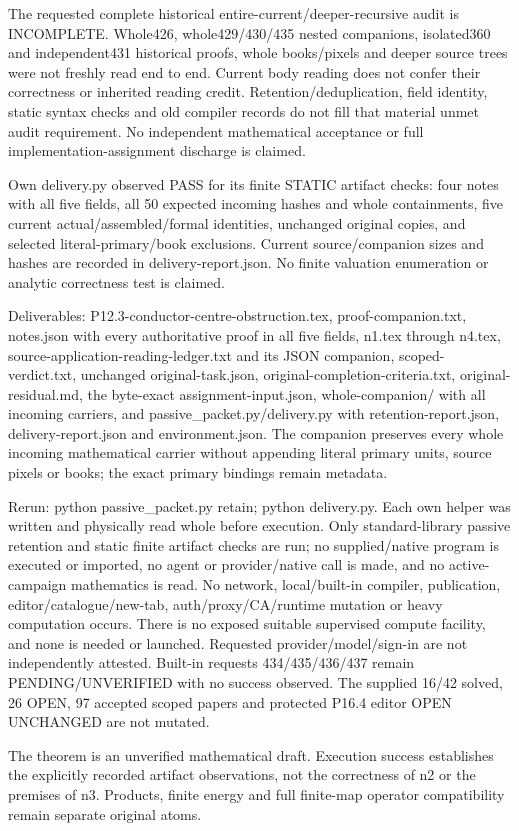The requested complete historical entire-current/deeper-recursive audit is
INCOMPLETE. Whole426, whole429/430/435 nested companions, isolated360 and
independent431 historical proofs, whole books/pixels and deeper source trees
were not freshly read end to end. Current body reading does not confer
their correctness or inherited reading credit. Retention/deduplication,
field identity, static syntax checks and old compiler records do not fill
that material unmet audit requirement. No independent mathematical
acceptance or full implementation-assignment discharge is claimed.

Own delivery.py observed PASS for its finite STATIC artifact checks:
four notes with all five fields, all 50 expected incoming hashes and whole
containments, five current actual/assembled/formal identities, unchanged
original copies, and selected literal-primary/book exclusions. Current
source/companion sizes and hashes are recorded in delivery-report.json.
No finite valuation enumeration or analytic correctness test is claimed.

Deliverables: P12.3-conductor-centre-obstruction.tex, proof-companion.txt,
notes.json with every authoritative proof in all five fields, n1.tex through
n4.tex, source-application-reading-ledger.txt and its JSON companion,
scoped-verdict.txt, unchanged original-task.json,
original-completion-criteria.txt, original-residual.md, the byte-exact
assignment-input.json, whole-companion/ with all incoming carriers, and
passive_packet.py/delivery.py with retention-report.json,
delivery-report.json and environment.json. The companion preserves every
whole incoming mathematical carrier without appending literal primary
units, source pixels or books; the exact primary bindings remain metadata.

Rerun: python passive_packet.py retain; python delivery.py.
Each own helper was written and physically read whole before execution.
Only standard-library passive retention and static finite artifact checks
are run; no supplied/native program is executed or imported, no agent or
provider/native call is made, and no active-campaign mathematics is read.
No network, local/built-in compiler, publication, editor/catalogue/new-tab,
auth/proxy/CA/runtime mutation or heavy computation occurs. There is no
exposed suitable supervised compute facility, and none is needed or
launched. Requested provider/model/sign-in are not independently attested.
Built-in requests 434/435/436/437 remain PENDING/UNVERIFIED with no success
observed. The supplied 16/42 solved, 26 OPEN, 97 accepted scoped papers and
protected P16.4 editor OPEN UNCHANGED are not mutated.

The theorem is an unverified mathematical draft. Execution success
establishes the explicitly recorded artifact observations, not the
correctness of n2 or the premises of n3. Products, finite energy and full
finite-map operator compatibility remain separate original atoms.
